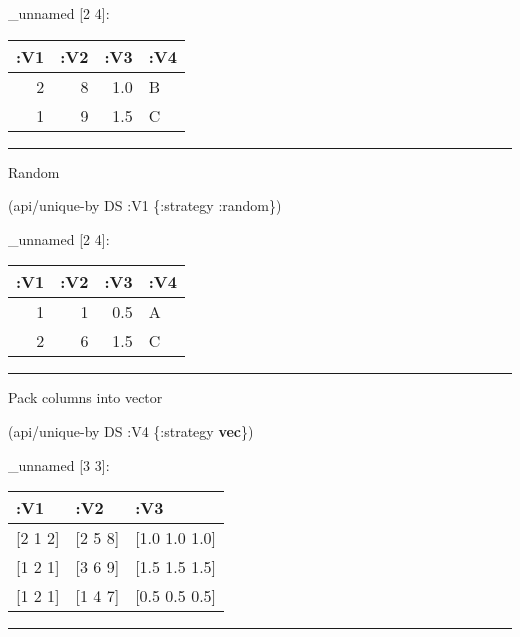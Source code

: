 \documentclass[]{article}
\newenvironment{Shaded}{\begin{snugshade}}{\end{snugshade}}
\newcommand{\KeywordTok}[1]{\textcolor[rgb]{0.13,0.29,0.53}{\textbf{#1}}}
\newcommand{\AttributeTok}[1]{\textcolor[rgb]{0.77,0.63,0.00}{#1}}
\newcommand{\NormalTok}[1]{#1}
\begin{document}
\_unnamed {[}2 4{]}:

\begin{longtable}[]{@{}rrrl@{}}
\toprule
:V1 & :V2 & :V3 & :V4\tabularnewline
\midrule
\endhead
2 & 8 & 1.0 & B\tabularnewline
1 & 9 & 1.5 & C\tabularnewline
\bottomrule
\end{longtable}

\begin{center}\rule{0.5\linewidth}{0.5pt}\end{center}

Random

\begin{Shaded}
\begin{Highlighting}[]
\NormalTok{(api/unique-by DS }\AttributeTok{:V1}\NormalTok{ \{}\AttributeTok{:strategy} \AttributeTok{:random}\NormalTok{\})}
\end{Highlighting}
\end{Shaded}

\_unnamed {[}2 4{]}:

\begin{longtable}[]{@{}rrrl@{}}
\toprule
:V1 & :V2 & :V3 & :V4\tabularnewline
\midrule
\endhead
1 & 1 & 0.5 & A\tabularnewline
2 & 6 & 1.5 & C\tabularnewline
\bottomrule
\end{longtable}

\begin{center}\rule{0.5\linewidth}{0.5pt}\end{center}

Pack columns into vector

\begin{Shaded}
\begin{Highlighting}[]
\NormalTok{(api/unique-by DS }\AttributeTok{:V4}\NormalTok{ \{}\AttributeTok{:strategy} \KeywordTok{vec}\NormalTok{\})}
\end{Highlighting}
\end{Shaded}

\_unnamed {[}3 3{]}:

\begin{longtable}[]{@{}lll@{}}
\toprule
:V1 & :V2 & :V3\tabularnewline
\midrule
\endhead
{[}2 1 2{]} & {[}2 5 8{]} & {[}1.0 1.0 1.0{]}\tabularnewline
{[}1 2 1{]} & {[}3 6 9{]} & {[}1.5 1.5 1.5{]}\tabularnewline
{[}1 2 1{]} & {[}1 4 7{]} & {[}0.5 0.5 0.5{]}\tabularnewline
\bottomrule
\end{longtable}

\begin{center}\rule{0.5\linewidth}{0.5pt}\end{center}
\end{document}
